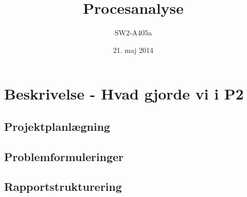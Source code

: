 \documentclass[a4paper,12pt,oneside]{article}
\title{Procesanalyse}
\author{SW2-A405a}
\date{21. maj 2014}
\begin{document}
\maketitle



\section{Beskrivelse - Hvad gjorde vi i P2} 

\subsection{Projektplanlægning}

\subsection{Problemformuleringer}

\subsection{Rapportstrukturering}
\end{document}
